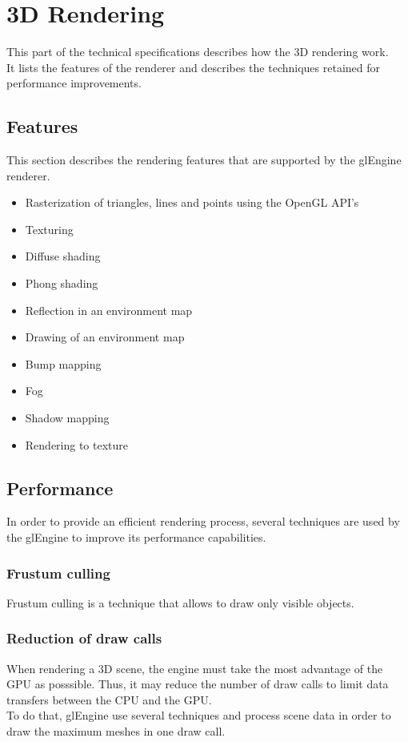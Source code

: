 \documentclass [a4 paper,11pt]{report}
\begin{document}
\chapter{3D Rendering}
This part of the technical specifications describes how the 3D rendering work.\\
It lists the features of the renderer and describes the techniques retained for performance improvements.

\section{Features}
This section describes the rendering features that are supported by the glEngine renderer.

\begin{itemize}
\item Rasterization of triangles, lines and points using the OpenGL API's
\item Texturing
\item Diffuse shading
\item Phong shading
\item Reflection in an environment map
\item Drawing of an environment map
\item Bump mapping
\item Fog
\item Shadow mapping
\item Rendering to texture
\end{itemize}

\section{Performance}
In order to provide an efficient rendering process, several techniques are used by the glEngine to improve its performance capabilities.

\subsection{Frustum culling}
Frustum culling is a technique that allows to draw only visible objects.

\subsection{Reduction of draw calls}
When rendering a 3D scene, the engine must take the most advantage of the GPU as posssible. Thus, it may reduce the number of draw calls to limit data transfers between the CPU and the GPU.\\
To do that, glEngine use several techniques and process scene data in order to draw the maximum meshes in one draw call.
\end{document}
